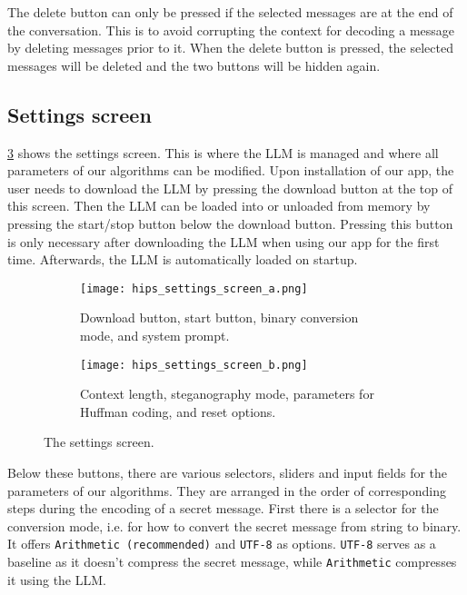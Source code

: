 The delete button can only be pressed if the selected messages are at the end of the conversation. This is to avoid corrupting the context for decoding a message by deleting messages prior to it. When the delete button is pressed, the selected messages will be deleted and the two buttons will be hidden again.

\subsection{Settings screen}
\label{sec:settingsScreen}
\cref{fig:settingsScreen} shows the settings screen. This is where the \gls{LLM} is managed and where all parameters of our algorithms can be modified. Upon installation of our app, the user needs to download the \gls{LLM} by pressing the download button at the top of this screen. Then the \gls{LLM} can be loaded into or unloaded from memory by pressing the start/stop button below the download button. Pressing this button is only necessary after downloading the \gls{LLM} when using our app for the first time. Afterwards, the \gls{LLM} is automatically loaded on startup.

\begin{figure}
	\begin{wide}
		\captionsetup{width=\linewidth}
		\begin{subfigure}{0.45\linewidth}
			\centering
			\texttt{[image: hips\_settings\_screen\_a.png]}
			\caption{Download button, start button, binary conversion mode, and system prompt.}
			\label{fig:settingsScreenA}
		\end{subfigure}
        \hfill
        \begin{subfigure}{0.45\linewidth}
			\centering
			\texttt{[image: hips\_settings\_screen\_b.png]}
			\caption{Context length, steganography mode, parameters for Huffman coding, and reset options.}
			\label{fig:settingsScreenB}
		\end{subfigure}
		\caption[HiPS: Settings screen]{The settings screen.}
		\label{fig:settingsScreen}
	\end{wide}
\end{figure}

Below these buttons, there are various selectors, sliders and input fields for the parameters of our algorithms. They are arranged in the order of corresponding steps during the encoding of a secret message. First there is a selector for the conversion mode, i.e. for how to convert the secret message from string to binary. It offers \lstinline|Arithmetic (recommended)| and \lstinline|UTF-8| as options. \lstinline|UTF-8| serves as a baseline as it doesn't compress the secret message, while \lstinline|Arithmetic| compresses it using the \gls{LLM}.

